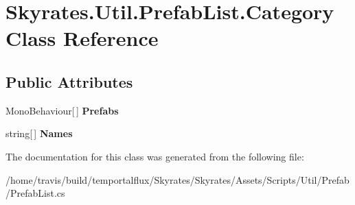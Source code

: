 \hypertarget{class_skyrates_1_1_util_1_1_prefab_list_1_1_category}{\section{Skyrates.\-Util.\-Prefab\-List.\-Category Class Reference}
\label{class_skyrates_1_1_util_1_1_prefab_list_1_1_category}
}
\subsection*{Public Attributes}
\begin{DoxyCompactItemize}
\item 
\hypertarget{class_skyrates_1_1_util_1_1_prefab_list_1_1_category_a6d0393dbdaea08350b2793b2dfe3ef46}{Mono\-Behaviour\mbox{[}$\,$\mbox{]} {\bfseries Prefabs}}\label{class_skyrates_1_1_util_1_1_prefab_list_1_1_category_a6d0393dbdaea08350b2793b2dfe3ef46}

\item 
\hypertarget{class_skyrates_1_1_util_1_1_prefab_list_1_1_category_ab3d21cb0abbab5c4740b4df4d0ad155e}{string\mbox{[}$\,$\mbox{]} {\bfseries Names}}\label{class_skyrates_1_1_util_1_1_prefab_list_1_1_category_ab3d21cb0abbab5c4740b4df4d0ad155e}

\end{DoxyCompactItemize}


The documentation for this class was generated from the following file\-:\begin{DoxyCompactItemize}
\item 
/home/travis/build/temportalflux/\-Skyrates/\-Skyrates/\-Assets/\-Scripts/\-Util/\-Prefab/Prefab\-List.\-cs\end{DoxyCompactItemize}

